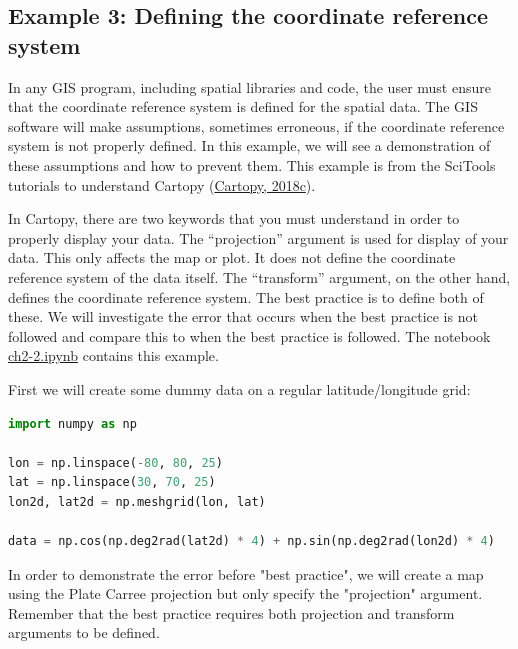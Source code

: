 \documentclass[a4paper , 12pt]{book}
\begin{document}
\subsection*{Example 3: Defining the coordinate reference system}

In any GIS program, including spatial libraries and code, the user must ensure that the coordinate reference system is defined for the spatial data. The GIS software will make assumptions, sometimes erroneous, if the coordinate reference system is not properly defined. In this example, we will see a demonstration of these assumptions and how to prevent them. This example is from the SciTools tutorials to understand Cartopy (\href{https://scitools.org.uk/cartopy/docs/latest/tutorials/understanding_transform.html}{Cartopy, 2018c}).

In Cartopy, there are two keywords that you must understand in order to properly display your data. The “projection” argument is used for display of your data. This only affects the map or plot. It does not define the coordinate reference system of the data itself. The “transform” argument, on the other hand, defines the coordinate reference system. The best practice is to define both of these. We will investigate the error that occurs when the best practice is not followed and compare this to when the best practice is followed. The notebook \href{http://github.com}{ch2-2.ipynb} contains this example.

First we will create some dummy data on a regular latitude/longitude grid:\\

\begin{center}
\begin{lstlisting}[language=Python, frame=single]
import numpy as np

lon = np.linspace(-80, 80, 25)
lat = np.linspace(30, 70, 25)
lon2d, lat2d = np.meshgrid(lon, lat)

data = np.cos(np.deg2rad(lat2d) * 4) + np.sin(np.deg2rad(lon2d) * 4)
\end{lstlisting}
\end{center}

In order to demonstrate the error before "best practice", we will create a map using the Plate Carree projection but only specify the "projection" argument. Remember that the best practice requires both projection and transform arguments to be defined.
\end{document}
